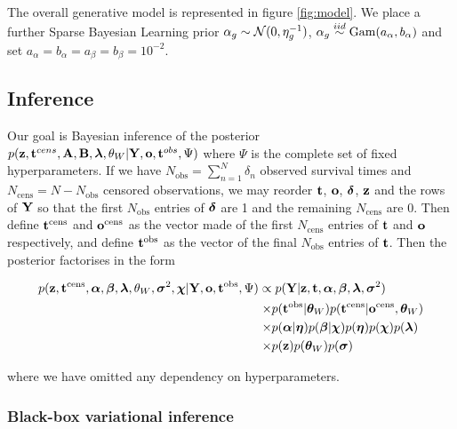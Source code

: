The overall generative model is represented in figure \ref{fig:model}. We place a further Sparse Bayesian Learning prior $\alpha_g \sim \mathcal{N}(0, \eta_g^{-1})$, $\alpha_g \stackrel{iid}{\sim} \textrm{Gam}(a_\alpha, b_\alpha)$ and set $a_\alpha = b_\alpha = a_\beta = b_\beta = 10^{-2}$.



\subsection{Inference}


Our goal is Bayesian inference of the posterior $p(\mathbf{z}, \mathbf{t}^{cens}, \mathbf{A}, \mathbf{B}, \bm{\lambda}, \theta_W | \mathbf{Y}, \mathbf{o}, \mathbf{t}^{obs}, \Psi)$ where $\Psi$ is the complete set of fixed hyperparameters. If we have $N_{\text{obs}} = \sum_{n = 1}^N \delta_n$ observed survival times and $N_{\text{cens}} = N - N_{\text{obs}}$ censored observations, we may reorder $\mathbf{t}$, $\mathbf{o}$,
$\bm{\delta}$, $\mathbf{z}$ and the rows of $\mathbf{Y}$ so that the first $N_{\text{obs}}$ entries of $\bm{\delta}$ are 1 and the remaining $N_{\text{cens}}$ are 0. Then define $\mathbf{t}^{\text{cens}}$ and $\mathbf{o}^{\text{cens}}$ as the vector made of the first $N_{\text{cens}}$ entries of $\mathbf{t}$ and $\mathbf{o}$ respectively, and define $\mathbf{t}^{\text{obs}}$
as the vector of the final $N_{\text{obs}}$ entries of $\mathbf{t}$. Then the posterior factorises in the form

\begin{equation}
  \begin{aligned}
    p(\mathbf{z}, \mathbf{t}^{\text{cens}}, \bm{\alpha}, \bm{\beta}, \bm{\lambda}, \theta_W, \bm{\sigma}^2, \bm{\chi}| \mathbf{Y}, \mathbf{o}, \mathbf{t}^{\text{obs}}, \Psi)
    \propto & \; p(\mathbf{Y} | \mathbf{z}, \mathbf{t}, \bm{\alpha}, \bm{\beta}, \bm{\lambda}, \bm{\sigma}^2) \\
     \times & p(\mathbf{t}^{\text{obs}} | \bm{\theta}_W) p(\mathbf{t}^{\text{cens}} | \mathbf{o}^{\text{cens}}, \bm{\theta}_W) \\
    \times & p(\bm{\alpha} | \bm{\eta}) p(\bm{\beta} | \bm{\chi}) p(\bm{\eta}) p(\bm{\chi}) p(\bm{\lambda}) \\
    \times &  p(\mathbf{z}) p(\bm{\theta}_W) p(\bm{\sigma})
  \end{aligned}
\end{equation}

where we have omitted any dependency on hyperparameters.

\subsubsection{Black-box variational inference}

